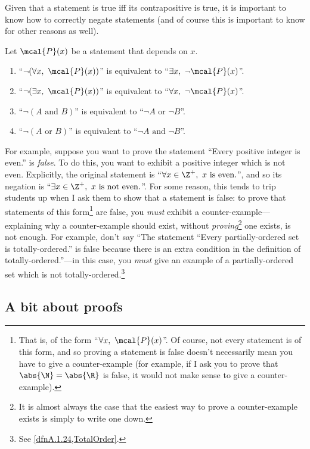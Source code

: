 Given that a statement is true iff its contrapositive is true, it is important to know how to correctly negate statements (and of course this is important to know for other reasons as well).
\begin{exm}{}{}
Let $\mcal{P}(x)$ be a statement that depends on $x$.
\begin{enumerate}
\item ``$\neg (\forall x,\ \mcal{P}(x))$'' is equivalent to ``$\exists x,\ \neg \mcal{P}(x)$''.
\item ``$\neg (\exists x,\ \mcal{P}(x))$'' is equivalent to ``$\forall x,\ \neg \mcal{P}(x)$''.
\item ``$\neg (A\text{ and }B)$'' is equivalent to ``$\neg A\text{ or }\neg B$''.
\item ``$\neg (A\text{ or }B)$'' is equivalent to ``$\neg A\text{ and }\neg B$''.
\end{enumerate}
\begin{rmk}
For example, suppose you want to prove the statement ``Every positive integer is even.'' is \emph{false}.  To do this, you want to exhibit a positive integer which is not even.  Explicitly, the original statement is ``$\forall x\in \Z ^+,\ x\text{ is even.}$'', and so its negation is ``$\exists x\in \Z ^+,\ x\text{ is not even.}$''.  For some reason, this tends to trip students up when I ask them to show that a statement is false:  to prove that statements of this form\footnote{That is, of the form ``$\forall x,\ \mcal{P}(x)$''.  Of course, not every statement is of this form, and so proving a statement is false doesn't necessarily mean you have to give a counter-example (for example, if I ask you to prove that $\abs{\N}=\abs{\R}$ is false, it would not make sense to give a counter-example).} are false, you \emph{must} exhibit a counter-example---explaining why a counter-example should exist, without \emph{proving}\footnote{It is almost always the case that the easiest way to prove a counter-example exists is simply to write one down.} one exists, is not enough.  For example, don't say ``The statement ``Every partially-ordered set is totally-ordered.'' is false because there is an extra condition in the definition of totally-ordered.''---in this case, you \emph{must} give an example of a partially-ordered set which is not totally-ordered.\footnote{See \cref{dfnA.1.24,TotalOrder}.}
\end{rmk}
\end{exm}

\subsection{A bit about proofs}

